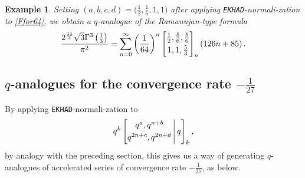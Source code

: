 \documentclass[12pt]{article}
\newtheorem{example}{Example}
\begin{document}
\begin{example}
 Setting $(a,b,c,d) = \big( \frac{1}{2}, \frac{1}{6}, 1, 1 \big)$
 after applying {\tt EKHAD}-normali-zation to 
 \eqref{Ffor64}, 
 we obtain a $q$-analogue of the Ramanujan-type formula 
\begin{equation*}
 \frac{ 2^{\frac{14}{3}} \sqrt{3} \Gamma^{3}\left( \frac{1}{3} \right) }{\pi^2} = 
 \sum_{n = 0}^{\infty} 
 \left( \frac{1}{64} \right)^{n} \left[ \begin{matrix} 
 \frac{1}{2}, \frac{5}{6}, \frac{5}{6} 
 \vspace{1mm} \\ 
 1, 1, \frac{5}{3} 
 \end{matrix} \right]_{n} \left( 126 n + 85 \right). 
 \end{equation*} 
\end{example}

\subsection{$q$-analogues for the convergence rate $-\frac{1}{27}$}
 By applying {\tt EKHAD}-normali-zation to 
 \begin{equation}\label{inputfor27}
 q^{k} \left[ \begin{matrix} 
 q^{a}, q^{n+b} \vspace{1mm} \\ 
 q^{2n+c}, q^{2n+d} \end{matrix} \, \Bigg| \, q \right]_{k}, 
\end{equation}
 by analogy with the preceding section, this gives us a way of generating 
 $q$-analogues of accelerated series of convergence rate $-\frac{1}{27}$, as below. 
\end{document}
